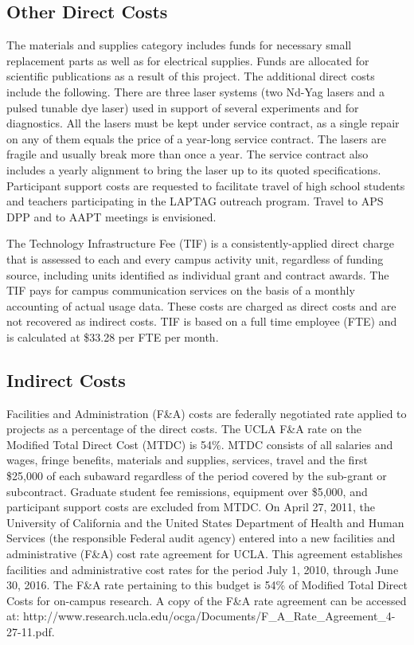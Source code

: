 \documentclass[11pt]{article}
\begin{document}
\subsection*{Other Direct Costs}

The materials and supplies category includes funds for necessary small
replacement parts as well as for electrical supplies. Funds are
allocated for scientific publications as a result of this project. The
additional direct costs include the following.  There are three laser
systems (two Nd-Yag lasers and a pulsed tunable dye laser) used in
support of several experiments and for diagnostics. All the lasers
must be kept under service contract, as a single repair on any of them
equals the price of a year-long service contract. The lasers are
fragile and usually break more than once a year. The service contract
also includes a yearly alignment to bring the laser up to its quoted
specifications.  Participant support costs are requested to facilitate
travel of high school students and teachers participating in the
LAPTAG outreach program.  Travel to APS DPP and to AAPT meetings is
envisioned.


The Technology Infrastructure Fee (TIF) is a consistently-applied direct charge that
is assessed to each and every campus activity unit, regardless of
funding source, including units identified as individual grant and
contract awards.  The TIF pays for campus communication services on
the basis of a monthly accounting of actual usage data.  These costs
are charged as direct costs and are not recovered as indirect costs.
TIF is based on a full time employee (FTE) and is calculated at \$33.28
per FTE per month.  


\subsection*{Indirect Costs}

Facilities and Administration (F\&A) costs are federally negotiated
rate applied to projects as a percentage of the direct costs.  The
UCLA F\&A rate on the Modified Total Direct Cost (MTDC) is 54\%.  MTDC
consists of all salaries and wages, fringe benefits, materials and
supplies, services, travel and the first \$25,000 of each subaward
regardless of the period covered by the sub-grant or subcontract.
Graduate student fee remissions, equipment over \$5,000, and
participant support costs are excluded from MTDC.  On April 27, 2011,
the University of California and the United States Department of
Health and Human Services (the responsible Federal audit agency)
entered into a new facilities and administrative (F\&A) cost rate
agreement for UCLA. This agreement establishes facilities and
administrative cost rates for the period July 1, 2010, through June
30, 2016.  The F\&A rate pertaining to this budget is 54\% of Modified
Total Direct Costs for on-campus research.  A copy of the F\&A rate
agreement can be accessed at: {\ttfamily
  http://www.research.ucla.edu/ocga/Documents/F\_A\_Rate\_Agreement\_4-27-11.pdf}.
\end{document}
